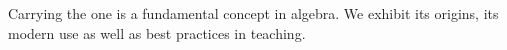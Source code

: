 Carrying the one is a fundamental concept in algebra.
We exhibit its origins, its modern use as well as best practices in teaching.
